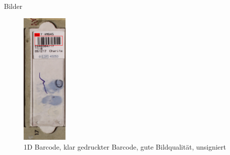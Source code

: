 \documentclass{beamer}
\begin{document}
\begin{frame}{Bilder}
\begin{figure}
      \hfill
      \includegraphics[width=0.2\textwidth]{./assets/Cell100426_1_7_top1_prosconsminweight.PNG}
      \caption{1D Barcode, klar gedruckter Barcode, gute Bildqualität, unsigniert}
    \end{figure}
  \end{frame}
\end{document}
